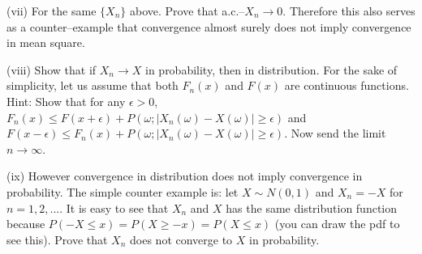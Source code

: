 \begin{question}
        \noindent(vii)  For the same $\{X_n\}$ above.  Prove that a.c.--$X_n\rightarrow 0$.
        Therefore this also serves as a counter--example that convergence almost
        surely does not imply convergence in mean square.

        \noindent(viii)  Show that if $X_n \rightarrow X$ in probability, then in distribution.
        For the sake of simplicity, let us assume that both $F_n(x)$ and $F(x)$ are continuous
        functions.  Hint: Show that for any
        $\epsilon>0$, $F_n(x)\leq F(x+\epsilon)+P(\omega;|X_n(\omega)-X(\omega)|\geq \epsilon)$
        and $F(x-\epsilon)\leq F_n(x)+P(\omega;|X_n(\omega)-X(\omega)|\geq \epsilon)$.
        Now send the limit $n\rightarrow \infty$.

        \noindent(ix) However convergence in distribution does not imply convergence
        in probability.  The simple counter example is: let $X\sim N(0,1)$ and $X_n=-X$
        for $n=1,2,....$  It is easy to see that $X_n$ and $X$ has the same distribution
        function because $P(-X\leq x)=P(X\geq -x)=P(X\leq x)$ (you can draw the pdf to see
        this).  Prove that $X_n$ does not converge to $X$ in probability.
    \end{question}
